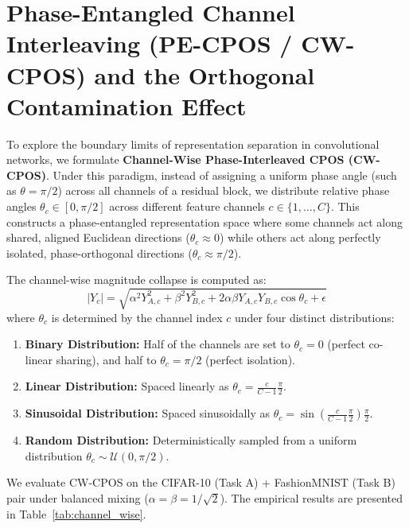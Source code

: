 \documentclass{article}
\theoremstyle{plain}
\theoremstyle{definition}
\theoremstyle{remark}
\begin{document}
\section{Phase-Entangled Channel Interleaving (PE-CPOS / CW-CPOS) and the Orthogonal Contamination Effect}
\label{subsec:channel_wise_cpos}
To explore the boundary limits of representation separation in convolutional networks, we formulate \textbf{Channel-Wise Phase-Interleaved CPOS (CW-CPOS)}. Under this paradigm, instead of assigning a uniform phase angle (such as $\theta = \pi/2$) across all channels of a residual block, we distribute relative phase angles $\theta_c \in [0, \pi/2]$ across different feature channels $c \in \{1, \dots, C\}$. This constructs a phase-entangled representation space where some channels act along shared, aligned Euclidean directions ($\theta_c \approx 0$) while others act along perfectly isolated, phase-orthogonal directions ($\theta_c \approx \pi/2$).

The channel-wise magnitude collapse is computed as:
\begin{equation}
|Y_c| = \sqrt{\alpha^2 Y_{A,c}^2 + \beta^2 Y_{B,c}^2 + 2 \alpha \beta Y_{A,c} Y_{B,c} \cos \theta_c + \epsilon}
\end{equation}
where $\theta_c$ is determined by the channel index $c$ under four distinct distributions:
\begin{enumerate}
\item \textbf{Binary Distribution:} Half of the channels are set to $\theta_c = 0$ (perfect co-linear sharing), and half to $\theta_c = \pi/2$ (perfect isolation).
\item \textbf{Linear Distribution:} Spaced linearly as $\theta_c = \frac{c}{C-1} \frac{\pi}{2}$.
\item \textbf{Sinusoidal Distribution:} Spaced sinusoidally as $\theta_c = \sin\left(\frac{c}{C-1} \frac{\pi}{2}\right) \frac{\pi}{2}$.
\item \textbf{Random Distribution:} Deterministically sampled from a uniform distribution $\theta_c \sim \mathcal{U}(0, \pi/2)$.
\end{enumerate}

We evaluate CW-CPOS on the CIFAR-10 (Task A) + FashionMNIST (Task B) pair under balanced mixing ($\alpha = \beta = 1/\sqrt{2}$). The empirical results are presented in Table~\ref{tab:channel_wise}.
\end{document}
